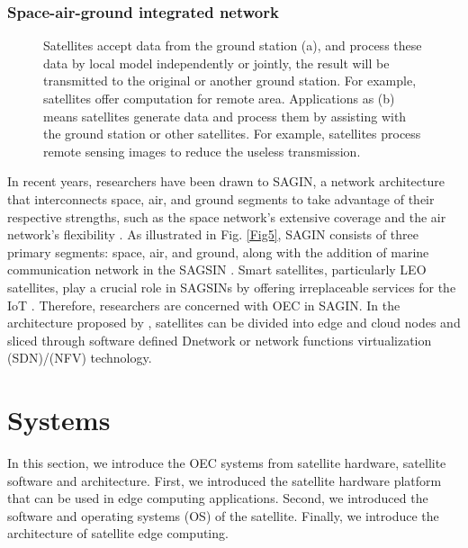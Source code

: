 \documentclass[lettersize,journal]{IEEEtran}
\begin{document}
\subsubsection*{Space-air-ground integrated network}

\begin{figure*}[h!]
  \centering
  

    \centering
    \caption{Satellites accept data from the ground station (a), and process these data by local model independently or jointly, the result will be transmitted to the original or another ground station. For example, satellites offer computation for remote area. Applications as (b) means satellites generate data and process them by assisting with the ground station or other satellites. For example, satellites process remote sensing images to reduce the useless transmission.}
    \label{fig8}
  \end{figure*}

In recent years, researchers have been drawn to SAGIN, a network architecture that interconnects space, air, and ground segments to take advantage of their respective strengths, such as the space network's extensive coverage and the air network's flexibility \cite{RN88}. As illustrated in Fig. \ref{Fig5}, SAGIN consists of three primary segments: space, air, and ground, along with the addition of marine communication network in the SAGSIN \cite{RN207}. Smart satellites, particularly LEO satellites, play a crucial role in SAGSINs by offering irreplaceable services for the IoT \cite{RN208}. Therefore, researchers are concerned with OEC in SAGIN. In the architecture proposed by \cite{RN56}, satellites can be divided into edge and cloud nodes and sliced through software defined Dnetwork or network functions virtualization (SDN)/(NFV) technology.


\section{Systems}
\label{sec3-1}
In this section, we introduce the OEC systems from satellite hardware, satellite software and architecture. First, we introduced the satellite hardware platform that can be used in edge computing applications. Second, we introduced the software and operating systems (OS) of the satellite. Finally, we introduce the architecture of satellite edge computing.
\end{document}
